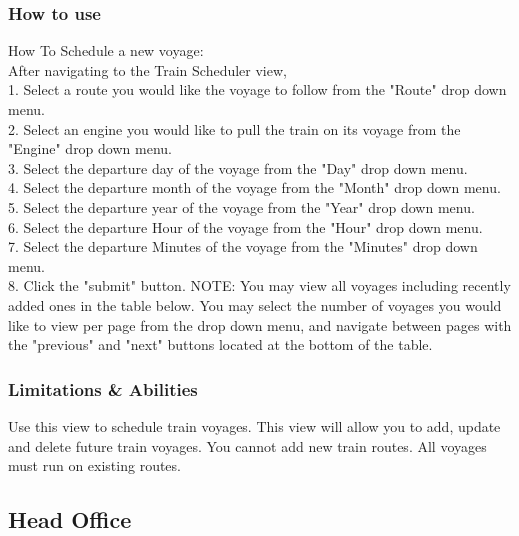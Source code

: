 \documentclass[letter]{article}
\begin{document}
\subsubsection{How to use}
How To Schedule a new voyage:\\
After navigating to the Train Scheduler view,\\ 
1. Select a route you would like the voyage to follow from the "Route" drop down menu.\\
2. Select an engine you would like to pull the train on its voyage from the "Engine" drop down menu.\\
3. Select the departure day of the voyage from the "Day" drop down menu.\\
4. Select the departure month of the voyage from the "Month" drop down menu.\\
5. Select the departure year of the voyage from the "Year" drop down menu.\\
6. Select the departure Hour of the voyage from the "Hour" drop down menu.\\
7. Select the departure Minutes of the voyage from the "Minutes" drop down menu.\\
8. Click the "submit" button. 
NOTE: You may view all voyages including recently added ones in the table below. You may select the number of voyages you would like to view per page from the drop down menu, and navigate between pages with the "previous" and "next" buttons located at the bottom of the table. 


\subsubsection{Limitations \& Abilities}
Use this view to schedule train voyages. This view will allow you to add, update and delete future train voyages. You cannot add new train routes. All voyages must run on existing routes.


\subsection{Head Office}
\end{document}
